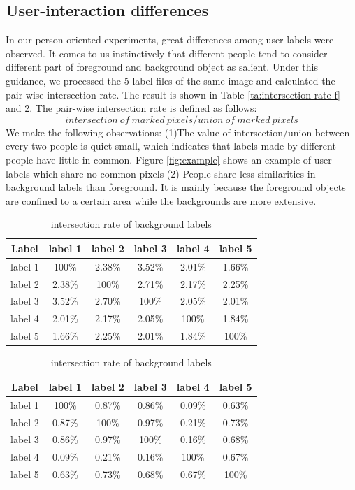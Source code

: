 \documentclass[runningheads,a4paper]{llncs}
\begin{document}
\subsection{User-interaction differences}
In our person-oriented experiments, great differences among user labels were observed. It comes to us instinctively that different people tend to consider different part of foreground and background object as salient. Under this guidance, we processed the 5 label files of the same image and calculated the pair-wise intersection rate. The result is shown in Table \ref{ta:intersection rate f} and \ref{ta:intersection rate b}. The pair-wise intersection rate is defined as follows:
$$intersection\ of\ marked\ pixels/union\ of\ marked\ pixels$$
We make the following observations: (1)The value of intersection/union between every two people is quiet small, which indicates that labels made by different people have little in common. Figure \ref{fig:example} shows an example of user labels which share no common pixels (2) People share less similarities in background labels than foreground. It is mainly because the foreground objects are confined to a certain area while the backgrounds are more extensive.




\begin{table}
\parbox{.35\linewidth}{
\centering
\begin{tabular}{|c|c|c|c|c|c|}
\hline
 Label & label 1 & label 2 & label 3 & label 4& label 5 \\
\hline
label 1 & 100\% & 2.38\% & 3.52\% & 2.01\%& 1.66\% \\
\hline
label 2 & 2.38\% & 100\% & 2.71\% & 2.17\%& 2.25\% \\
\hline
label 3 & 3.52\% & 2.70\% & 100\% & 2.05\%& 2.01\%\\
\hline
label 4 & 2.01\% & 2.17\% & 2.05\% & 100\%& 1.84\% \\
\hline
label 5 & 1.66\% & 2.25\% & 2.01\% & 1.84\%& 100\% \\
\hline
\end{tabular}
\caption{intersection rate of foreground labels}
\label{ta:intersection rate f}
}
\hfill
\parbox{.35\linewidth}{
\centering
\begin{tabular}{|c|c|c|c|c|c|}
\hline
 Label & label 1 & label 2 & label 3 & label 4& label 5 \\
\hline
label 1 & 100\% & 0.87\% & 0.86\% & 0.09\%& 0.63\% \\
\hline
label 2 & 0.87\% & 100\% & 0.97\% & 0.21\%& 0.73\% \\
\hline
label 3 & 0.86\% & 0.97\% & 100\% & 0.16\%& 0.68\%\\
\hline
label 4 & 0.09\% & 0.21\% & 0.16\% & 100\%& 0.67\% \\
\hline
label 5 & 0.63\% & 0.73\% & 0.68\% & 0.67\% & 100\% \\
\hline
\end{tabular}
\captionsetup{justification=centerlast}
\caption{intersection rate of background labels}
\label{ta:intersection rate b}
}
\end{table}
\end{document}
